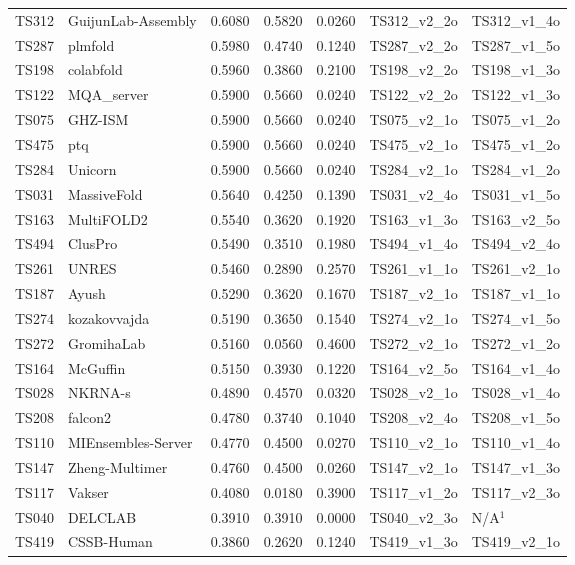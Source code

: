 \begin{table}[ht]
{\begin{tabular}{llrrrll}
TS312 & GuijunLab-Assembly & 0.6080 & 0.5820 & 0.0260 & TS312\_v2\_2o & TS312\_v1\_4o \\ 
TS287 & plmfold & 0.5980 & 0.4740 & 0.1240 & TS287\_v2\_2o & TS287\_v1\_5o \\ 
TS198 & colabfold & 0.5960 & 0.3860 & 0.2100 & TS198\_v2\_2o & TS198\_v1\_3o \\ 
TS122 & MQA\_server & 0.5900 & 0.5660 & 0.0240 & TS122\_v2\_2o & TS122\_v1\_3o \\ 
TS075 & GHZ-ISM & 0.5900 & 0.5660 & 0.0240 & TS075\_v2\_1o & TS075\_v1\_2o \\ 
TS475 & ptq & 0.5900 & 0.5660 & 0.0240 & TS475\_v2\_1o & TS475\_v1\_2o \\ 
TS284 & Unicorn & 0.5900 & 0.5660 & 0.0240 & TS284\_v2\_1o & TS284\_v1\_2o \\ 
TS031 & MassiveFold & 0.5640 & 0.4250 & 0.1390 & TS031\_v2\_4o & TS031\_v1\_5o \\ 
TS163 & MultiFOLD2 & 0.5540 & 0.3620 & 0.1920 & TS163\_v1\_3o & TS163\_v2\_5o \\ 
TS494 & ClusPro & 0.5490 & 0.3510 & 0.1980 & TS494\_v1\_4o & TS494\_v2\_4o \\ 
TS261 & UNRES & 0.5460 & 0.2890 & 0.2570 & TS261\_v1\_1o & TS261\_v2\_1o \\ 
TS187 & Ayush & 0.5290 & 0.3620 & 0.1670 & TS187\_v2\_1o & TS187\_v1\_1o \\ 
TS274 & kozakovvajda & 0.5190 & 0.3650 & 0.1540 & TS274\_v2\_1o & TS274\_v1\_5o \\ 
TS272 & GromihaLab & 0.5160 & 0.0560 & 0.4600 & TS272\_v2\_1o & TS272\_v1\_2o \\ 
TS164 & McGuffin & 0.5150 & 0.3930 & 0.1220 & TS164\_v2\_5o & TS164\_v1\_4o \\ 
TS028 & NKRNA-s & 0.4890 & 0.4570 & 0.0320 & TS028\_v2\_1o & TS028\_v1\_4o \\ 
TS208 & falcon2 & 0.4780 & 0.3740 & 0.1040 & TS208\_v2\_4o & TS208\_v1\_5o \\ 
TS110 & MIEnsembles-Server & 0.4770 & 0.4500 & 0.0270 & TS110\_v2\_1o & TS110\_v1\_4o \\ 
TS147 & Zheng-Multimer & 0.4760 & 0.4500 & 0.0260 & TS147\_v2\_1o & TS147\_v1\_3o \\ 
TS117 & Vakser & 0.4080 & 0.0180 & 0.3900 & TS117\_v1\_2o & TS117\_v2\_3o \\ 
TS040 & DELCLAB & 0.3910 & 0.3910 & 0.0000 & TS040\_v2\_3o & N/A$^{1}$ \\ 
TS419 & CSSB-Human & 0.3860 & 0.2620 & 0.1240 & TS419\_v1\_3o & TS419\_v2\_1o \\ 

\end{tabular}}
\end{table}

